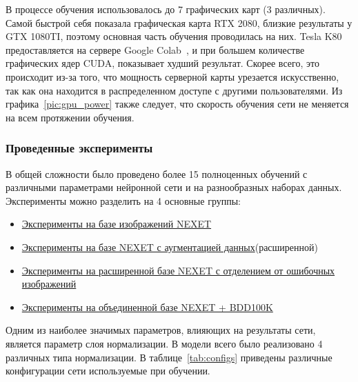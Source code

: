 \documentclass[11pt,a4paper]{extarticle}
\begin{document}
{		\noindent
		В процессе обучения использовалось до 7 графических карт (3 различных). 
		Самой быстрой себя показала графическая карта RTX 2080, близкие результаты у GTX 1080TI, поэтому основная часть обучения проводилась на них.
		Tesla K80 предоставляется на сервере Google Colab~\cite{colab}, и при большем количестве графических ядер CUDA, показывает худший результат.
		Скорее всего, это происходит из-за того, что мощность серверной карты урезается искусственно, так как она находится в распределенном доступе с другими пользователями.
		Из графика~\ref{pic:gpu_power} также следует, что скорость обучения сети не меняется на всем протяжении обучения. 

		\subsubsection*{Проведенные эксперименты}
			
			В общей сложности было проведено более 15 полноценных обучений с различными параметрами нейронной сети и на разнообразных наборах данных.
			Эксперименты можно разделить на 4 основные группы: 
			\begin{itemize}
				\item \hyperref[sec:tests:nexet]{Эксперименты на базе изображений NEXET}~\cite{data:nexet}
				\item \hyperref[sec:tests:nexet_ext]{Эксперименты на базе NEXET с аугментацией данных}\footnotemark[1] (расширенной)
				\item \hyperref[sec:tests:nexet_no_err]{Эксперименты на расширенной базе NEXET с отделением от ошибочных изображений}
				\item \hyperref[sec:tests:nexet_bdd]{Эксперименты на объединенной базе NEXET + BDD100K}~\cite{data:bdd100k}
			\end{itemize}

			\noindent
			Одним из наиболее значимых параметров, влияющих на результаты сети, является параметр слоя нормализации.
			В модели всего было реализовано 4 различных типа нормализации.
			В таблице~\ref{tab:configs} приведены различные конфигурации сети используемые при обучении.
			
}
\end{document}
